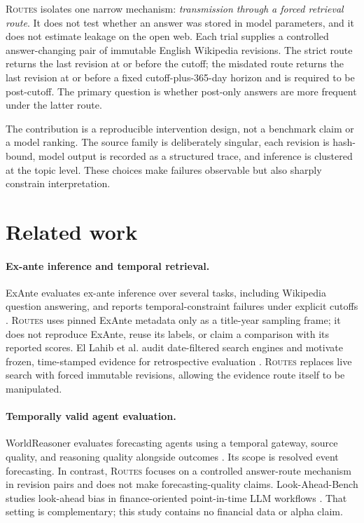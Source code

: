 \documentclass[11pt]{article}
\newcommand{\routes}{\textsc{Routes}}
\begin{document}
\routes{} isolates one narrow mechanism: \emph{transmission through a forced retrieval route}. It does not test whether an answer was stored in model parameters, and it does not estimate leakage on the open web. Each trial supplies a controlled answer-changing pair of immutable English Wikipedia revisions. The strict route returns the last revision at or before the cutoff; the misdated route returns the last revision at or before a fixed cutoff-plus-365-day horizon and is required to be post-cutoff. The primary question is whether post-only answers are more frequent under the latter route.

The contribution is a reproducible intervention design, not a benchmark claim or a model ranking. The source family is deliberately singular, each revision is hash-bound, model output is recorded as a structured trace, and inference is clustered at the topic level. These choices make failures observable but also sharply constrain interpretation.

\section{Related work}

\paragraph{Ex-ante inference and temporal retrieval.}
ExAnte evaluates ex-ante inference over several tasks, including Wikipedia question answering, and reports temporal-constraint failures under explicit cutoffs \citep{liu-etal-2026-exante}. \routes{} uses pinned ExAnte metadata only as a title-year sampling frame; it does not reproduce ExAnte, reuse its labels, or claim a comparison with its reported scores. El Lahib et al. audit date-filtered search engines and motivate frozen, time-stamped evidence for retrospective evaluation \citep{el-lahib-etal-2026-temporal}. \routes{} replaces live search with forced immutable revisions, allowing the evidence route itself to be manipulated.

\paragraph{Temporally valid agent evaluation.}
WorldReasoner evaluates forecasting agents using a temporal gateway, source quality, and reasoning quality alongside outcomes \citep{chi-etal-2026-worldreasoner}. Its scope is resolved event forecasting. In contrast, \routes{} focuses on a controlled answer-route mechanism in revision pairs and does not make forecasting-quality claims. Look-Ahead-Bench studies look-ahead bias in finance-oriented point-in-time LLM workflows \citep{benhenda-2026-lookahead}. That setting is complementary; this study contains no financial data or alpha claim.
\end{document}

